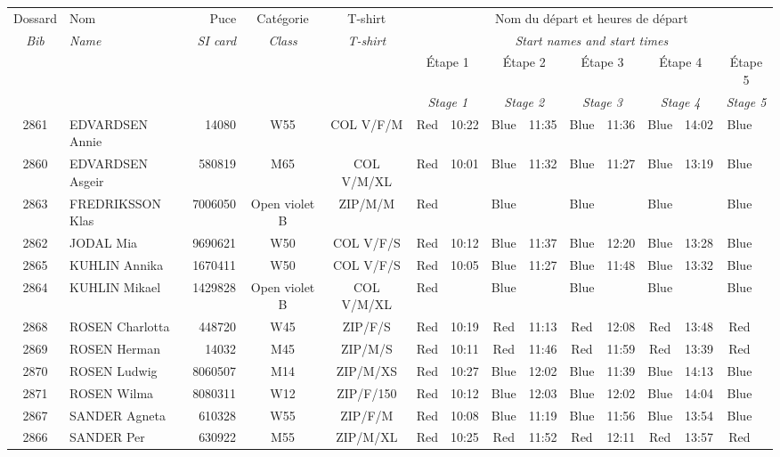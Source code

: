 \documentclass{report}
\begin{document}
  \begin{longtable}{|c|l|r|c|c|*{5}{cc|}}
    Dossard & Nom  & Puce    & Catégorie & T-shirt & \multicolumn{10}{c|}{Nom du départ et heures de départ} \\
    \itshape Bib     & \itshape Name & \itshape SI card & \itshape Class  & \itshape  T-shirt  & \multicolumn{10}{c|}{\itshape Start names and start times} \\
    \hline
    & & & & & \multicolumn{2}{c|}{Étape 1} & \multicolumn{2}{c|}{Étape 2} & \multicolumn{2}{c|}{Étape 3} & \multicolumn{2}{c|}{Étape 4} & \multicolumn{2}{c|}{Étape 5} \\
    & & & & & \multicolumn{2}{c|}{\itshape Stage 1} & \multicolumn{2}{c|}{\itshape Stage 2} & \multicolumn{2}{c|}{\itshape Stage 3} & \multicolumn{2}{c|}{\itshape Stage 4} & \multicolumn{2}{c|}{\itshape Stage 5} \\
    \hline
    2861 & EDVARDSEN Annie & 14080 & W55 & COL V/F/M & Red & 10:22 & Blue & 11:35 & Blue & 11:36 & Blue & 14:02 & Blue &  \\
    2860 & EDVARDSEN Asgeir & 580819 & M65 & COL V/M/XL & Red & 10:01 & Blue & 11:32 & Blue & 11:27 & Blue & 13:19 & Blue &  \\
    2863 & FREDRIKSSON Klas & 7006050 & Open violet B & ZIP/M/M & Red &   & Blue &   & Blue &   & Blue &   & Blue &  \\
    2862 & JODAL Mia & 9690621 & W50 & COL V/F/S & Red & 10:12 & Blue & 11:37 & Blue & 12:20 & Blue & 13:28 & Blue &  \\
    2865 & KUHLIN Annika & 1670411 & W50 & COL V/F/S & Red & 10:05 & Blue & 11:27 & Blue & 11:48 & Blue & 13:32 & Blue &  \\
    2864 & KUHLIN Mikael & 1429828 & Open violet B & COL V/M/XL & Red &   & Blue &   & Blue &   & Blue &   & Blue &  \\
    2868 & ROSEN Charlotta & 448720 & W45 & ZIP/F/S & Red & 10:19 & Red & 11:13 & Red & 12:08 & Red & 13:48 & Red &  \\
    2869 & ROSEN Herman & 14032 & M45 & ZIP/M/S & Red & 10:11 & Red & 11:46 & Red & 11:59 & Red & 13:39 & Red &  \\
    2870 & ROSEN Ludwig & 8060507 & M14 & ZIP/M/XS & Red & 10:27 & Blue & 12:02 & Blue & 11:39 & Blue & 14:13 & Blue &  \\
    2871 & ROSEN Wilma & 8080311 & W12 & ZIP/F/150 & Red & 10:12 & Blue & 12:03 & Blue & 12:02 & Blue & 14:04 & Blue &  \\
    2867 & SANDER Agneta & 610328 & W55 & ZIP/F/M & Red & 10:08 & Blue & 11:19 & Blue & 11:56 & Blue & 13:54 & Blue &  \\
    2866 & SANDER Per & 630922 & M55 & ZIP/M/XL & Red & 10:25 & Red & 11:52 & Red & 12:11 & Red & 13:57 & Red &  \\
  \end{longtable}
\end{document}
